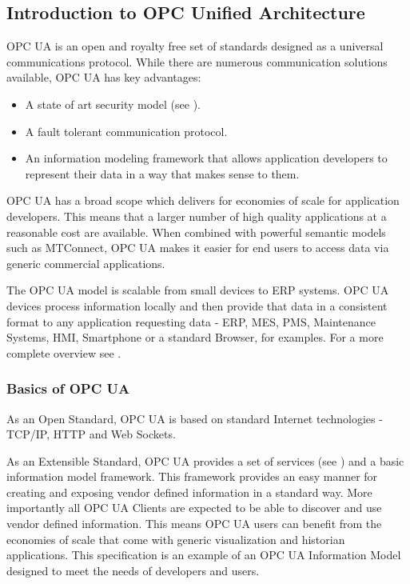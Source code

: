 \subsection{Introduction to OPC Unified Architecture}

OPC UA is an open and royalty free set of standards designed as a universal communications protocol.
While there are numerous communication solutions available, OPC UA has key advantages:

\begin{itemize}
\item A state of art security model (see \cite{UAPart2}).
\item A fault tolerant communication protocol.
\item An information modeling framework that allows application developers to represent their data in a way that makes sense to them.
\end{itemize}

OPC UA has a broad scope which delivers for economies of scale for application developers. This means that a larger number of high quality applications at a reasonable cost are available. When combined with powerful semantic models such as MTConnect, OPC UA makes it easier for end users to access data via generic commercial applications.

The OPC UA model is scalable from small devices to ERP systems. OPC UA devices process information locally and then provide that data in a consistent format to any application requesting data - ERP, MES, PMS, Maintenance Systems, HMI, Smartphone or a standard Browser, for examples. For a more complete overview see \cite{UAPart1}.

\subsubsection{Basics of OPC UA}

As an Open Standard, OPC UA is based on standard Internet technologies - TCP/IP, HTTP and Web Sockets.

As an Extensible Standard, OPC UA provides a set of services (see \cite{UAPart4}) and a basic information model framework. This framework provides an easy manner for creating and exposing vendor defined information in a standard way. More importantly all OPC UA Clients are expected to be able to discover and use vendor defined information. This means OPC UA users can benefit from the economies of scale that come with generic visualization and historian applications. This specification is an example of an OPC UA Information Model designed to meet the needs of developers and users.

